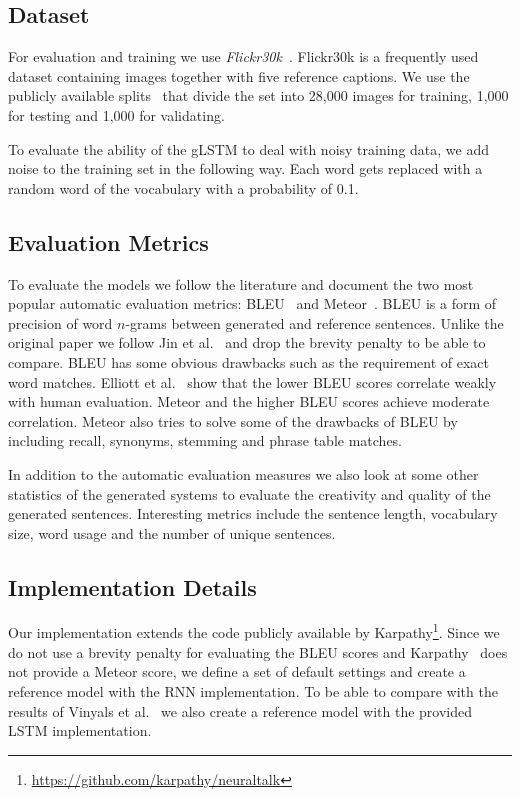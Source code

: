 \documentclass[twoside,twocolumn]{article}
\begin{document}
\subsection{Dataset}
For evaluation and training we use \emph{Flickr30k}~\cite{Young2014}. Flickr30k is a frequently used dataset containing images together with five reference captions. We use the publicly available splits~\cite{Karpathy2014} that divide the set into 28,000 images for training, 1,000 for testing and 1,000 for validating. 

To evaluate the ability of the gLSTM to deal with noisy training data, we add noise to the training set in the following way.
Each word gets replaced with a random word of the vocabulary with a probability of 0.1.
\subsection{Evaluation Metrics}
To evaluate the models we follow the literature and document the two most popular automatic evaluation metrics: BLEU~\cite{Papineni2002} and Meteor~\cite{Denkowski2007a}. BLEU is a form of precision of word $n$-grams between generated and reference sentences. Unlike the original paper we follow Jin et al.~\cite{Jin2015} and drop the brevity penalty to be able to compare. BLEU has some obvious drawbacks such as the requirement of exact word matches. Elliott et al.~\cite{Elliott2014} show that the lower BLEU scores correlate weakly with human evaluation. Meteor and the higher BLEU scores achieve moderate correlation. Meteor also tries to solve some of the drawbacks of BLEU by including recall, synonyms, stemming and phrase table matches.

In addition to the automatic evaluation measures we also look at some other statistics of the generated systems to evaluate the creativity and quality of the generated sentences.
Interesting metrics include the sentence length, vocabulary size, word usage and the number of unique sentences.

\subsection{Implementation Details}

Our implementation extends the code publicly available by Karpathy\footnote{\url{https://github.com/karpathy/neuraltalk}}.
Since we do not use a brevity penalty for evaluating the BLEU scores and Karpathy~\cite{Karpathy2015} does not provide a Meteor score, we define a set of default settings and create a reference model with the RNN implementation.
To be able to compare with the results of Vinyals et al.~\cite{Google} we also create a reference model with the provided LSTM implementation.
\end{document}
